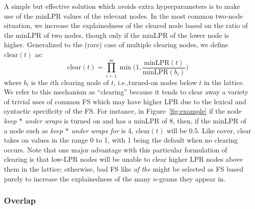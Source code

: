 \documentclass[11pt,letterpaper]{article}
\makeatletter
\def \ie {i.e.,\@ }
\newcommand{\gap}{$*$\xspace}
\newcommand{\ex}[1]{\textit{#1}\xspace}
\newcommand{\minLPR}{\ensuremath{\text{minLPR}}}
\newcommand{\cover}{\ensuremath{\text{cover}}\xspace}
\newcommand{\clear}{\ensuremath{\text{clear}}\xspace}
\newcommand{\figref}[2][]{Figure#1~\ref{#2}\xspace}
\makeatother
\begin{document}
A simple but effective solution which avoids extra hyperparameters is to make use of the minLPR values of the relevant nodes. In the most common two-node situation, we increase the explainedness of the cleared node based on the ratio of the minLPR of two nodes, though only if the minLPR of the lower node is higher. Generalized to the (rare) case of multiple clearing nodes, we define $\clear(t)$ as:
\begin{displaymath}
\clear(t) = \prod_{i=1}^{m}{\min\Big(1,\frac{\minLPR(t)}{\minLPR(b_i)}\Big)}
\end{displaymath}
where $b_i$ is the $i$th clearing node of $t$, \ie turned-on nodes below $t$ in the lattice. We refer to this mechanism as ``clearing'' because it tends to clear away a variety of trivial uses of common FS which may have higher LPR due to the lexical and syntactic specificity of the FS. For instance, in \figref{fig:example} if the node \ex{keep \gap under wraps}  is turned on and has a minLPR of 8, then, if the minLPR of a node such as \ex{keep \gap under wraps for} is 4, $\clear(t)$ will be 0.5. Like \cover, \clear takes on values in the range 0 to 1, with 1 being the default when no clearing occurs. Note that one major advantage with this particular formulation of clearing is that low-LPR nodes will be unable to clear higher LPR nodes above them in the lattice; otherwise, bad FS like \ex{of the} might be selected as FS based purely to increase the explainedness of the many $n$-grams they appear in.



\subsubsection{Overlap}
\end{document}
